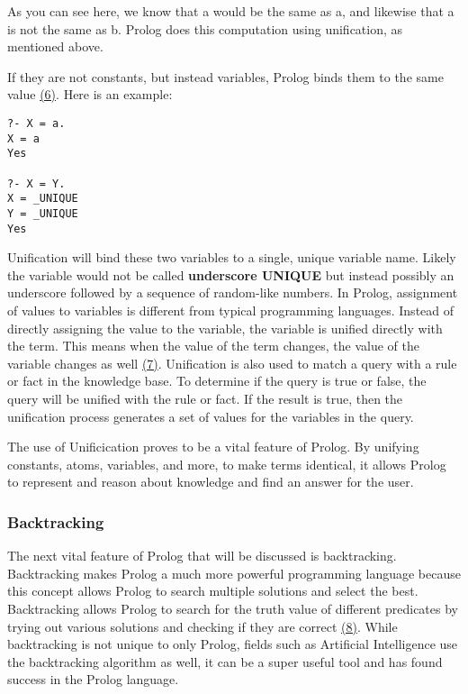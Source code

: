 \documentclass{article}
\theoremstyle{theorem}
\theoremstyle{definition}
\theoremstyle{remark}
\begin{document}
As you can see here, we know that a would be the same as a, and likewise that a is not the same as b. Prolog does this computation using unification, as mentioned above.

If they are not constants, but instead variables, Prolog binds them to the same value \href{https://www.dai.ed.ac.uk/groups/ssp/bookpages/quickprolog/node12.html}{(6)}. Here is an example:
\begin{verbatim}
?- X = a.
X = a
Yes

?- X = Y.
X = _UNIQUE
Y = _UNIQUE
Yes

\end{verbatim}

\noindent\newline Unification will bind these two variables to a single, unique variable name. Likely the variable would not be called \textbf{underscore UNIQUE} but instead possibly an underscore followed by a sequence of random-like numbers.  In Prolog, assignment of values to variables is different from typical programming languages. Instead of directly assigning the value to the variable, the variable is unified directly with the term. This means when the value of the term changes, the value of the variable changes as well \href{https://cliplab.org/~logalg/doc/The_Art_of_Prolog.pdf}{(7)}. Unification is also used to match a query with a rule or fact in the knowledge base. To determine if the query is true or false, the query will be unified with the rule or fact. If the result is true, then the unification process generates a set of values for the variables in the query. 

\noindent\newline The use of Unificication proves to be a vital feature of Prolog. By unifying constants, atoms, variables, and more, to make terms identical, it allows Prolog to represent and reason about knowledge and find an answer for the user.


\subsubsection{Backtracking}
\noindent\newline The next vital feature of Prolog that will be discussed is backtracking. Backtracking makes Prolog a much more powerful programming language because this concept allows Prolog to search multiple solutions and select the best. Backtracking allows Prolog to search for the truth value of different predicates by trying out various solutions and checking if they are correct \href{https://www.tutorialspoint.com/prolog/prolog_backtracking.htm#:~:text=Backtracking}{(8)}. While backtracking is not unique to only Prolog, fields such as Artificial Intelligence use the backtracking algorithm as well, it can be a super useful tool and has found success in the Prolog language.
\end{document}
